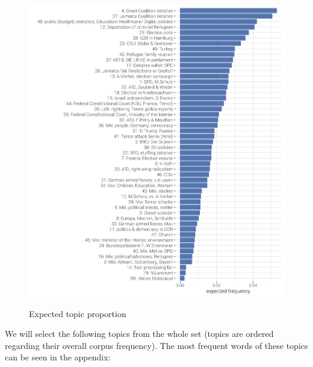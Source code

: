 \documentclass[12pt,a4paper,notitlepage]{article}
\begin{document}
\begin{figure}[H]
	\begin{center}
	\caption{Expected topic proportion}
		\includegraphics[width=\textwidth,keepaspectratio]{../figs/topic_proportion.png}
		\label{fig_topic_proportion}
\end{center}
\end{figure}

We will select the following topics from the whole set (topics are ordered regarding their overall corpus frequency). The most frequent words of these topics can be seen in the appendix:
\end{document}
